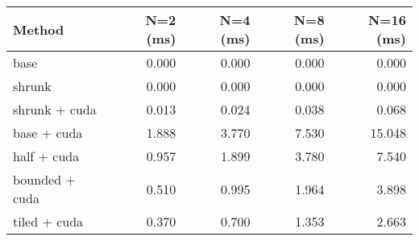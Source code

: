 \begin{tabular}{lrrrr}
\hline
 Method         &   N=2 (ms) &   N=4 (ms) &   N=8 (ms) &   N=16 (ms) \\
\hline
 base           &      0.000 &      0.000 &      0.000 &       0.000 \\
 shrunk         &      0.000 &      0.000 &      0.000 &       0.000 \\
 shrunk + cuda  &      0.013 &      0.024 &      0.038 &       0.068 \\
 base + cuda    &      1.888 &      3.770 &      7.530 &      15.048 \\
 half + cuda    &      0.957 &      1.899 &      3.780 &       7.540 \\
 bounded + cuda &      0.510 &      0.995 &      1.964 &       3.898 \\
 tiled + cuda   &      0.370 &      0.700 &      1.353 &       2.663 \\
\hline
\end{tabular}
